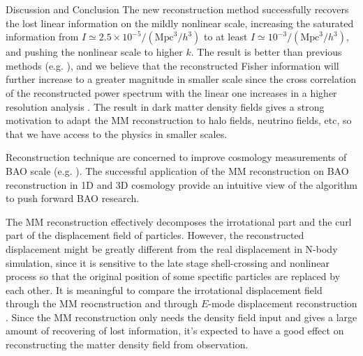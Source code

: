 \begin{section}{Discussion and Conclusion}
 \label{sec:conclusion}
 The new reconstruction method successfully recovers the lost linear
 information on the mildly nonlinear scale, increasing the saturated
 information from $I \simeq 2.5 \times 10^{-5}/(\mathrm{Mpc}^3/h^3)$
 to at least $I \simeq 10^{-3}/(\mathrm{Mpc}^3/h^3)$, and pushing the
 nonlinear scale to higher $k$.  The result is better than previous
 methods
 (e.g. \cite{bib:Mark2006,bib:Mark2009,bib:Zhang2011,bib:Yu2012}), and
 we believe that the reconstructed Fisher information will further
 increase to a greater magnitude in smaller scale since the cross
 correlation of the reconstructed power spectrum with the linear one
 increases in a higher resolution analysis \cite{bib:ZhuH2016}.  The
 result in dark matter density fields gives a strong motivation to
 adapt the MM reconstruction to halo fields, neutrino fields, etc, so
 that we have access to the physics in smaller scales.

 Reconstruction technique are concerned to improve cosmology
 measurements of BAO scale
 (e.g. \cite{bib:Daniel2007,bib:Martin2015}).  The successful
 application of the MM reconstruction on BAO reconstruction in 1D
 \cite{bib:Zhu2016} and 3D \cite{bib:ZhuH2016} cosmology provide an
 intuitive view of the algorithm to push forward BAO research.

 The MM reconstruction effectively decomposes the irrotational part
 and the curl part of the displacement field of particles. However,
 the reconstructed displacement might be greatly different from the
 real displacement in N-body simulation, since it is sensitive to the
 late stage shell-crossing and nonlinear process so that the original
 position of some spectific particles are replaced by each other.  It
 is meaningful to compare the irrotational displacement field through
 the MM reocnstruction and through $E$-mode displacement
 reconstruction \cite{bib:Yu2016}.  Since the MM reconstruction only
 needs the density field input and gives a large amount of recovering
 of lost information, it's expected to have a good effect on
 reconstructing the matter density field from observation.
\end{section}
